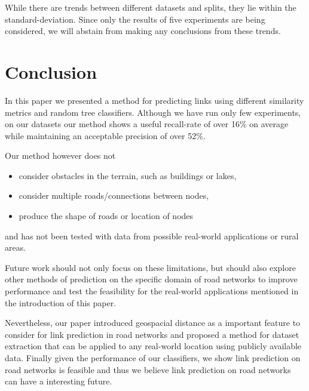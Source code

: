 \documentclass[12pt,a4paper]{IEEEtran}
\begin{document}
While there are trends between different datasets and splits,
they lie within the standard-deviation.
Since only the results of five experiments are being considered,
we will abstain from making any conclusions from these trends.

\section{Conclusion}\label{sec:conclusion}

In this paper we presented a method for predicting links using different similarity metrics and random tree classifiers.
Although we have run only few experiments,
on our datasets our method shows a useful recall-rate of over 16\% on average while maintaining an acceptable precision of over 52\%.

Our method however does not
\begin{itemize}
\item consider obstacles in the terrain, such as buildings or lakes,
\item consider multiple roads/connections between nodes,
\item produce the shape of roads or location of nodes
\end{itemize}
and has not been tested with data from possible real-world applications or rural areas.

Future work should not only focus on these limitations,
but should also explore other methods of prediction on the specific domain of road networks to improve performance
and test the feasibility for the real-world applications mentioned in the introduction of this paper.

Nevertheless, our paper introduced geospacial distance as a important feature to consider for link prediction in road networks and
proposed a method for dataset extraction that can be applied to any real-world location using publicly available data.
Finally given the performance of our classifiers, we show link prediction
on road networks is feasible and thus we believe link prediction on road networks can have a interesting future.


\theendnotes

\printbibliography
\end{document}

